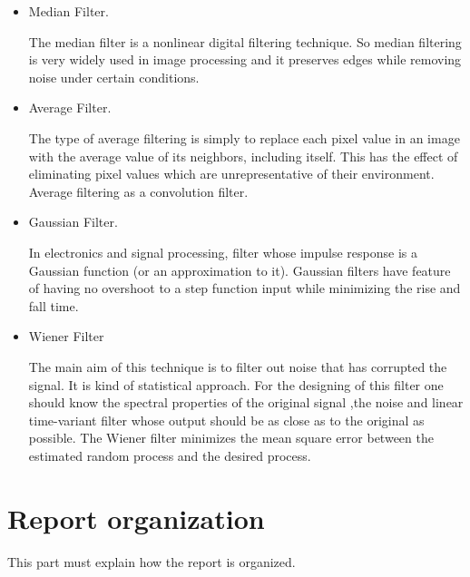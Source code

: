 \begin{itemize}
\item Median Filter.

The median filter is a nonlinear digital filtering technique. So median filtering is very widely used in
image processing and it preserves edges while removing noise under certain conditions.
\item Average Filter.

The type of average filtering is simply to replace each pixel value in an image with the average value of its neighbors, including itself. This has the effect of eliminating pixel values which are unrepresentative
of their environment. Average filtering as a convolution filter.
\item Gaussian Filter.

In electronics and signal processing, filter whose impulse response is a Gaussian function (or an approximation
to it). Gaussian filters have feature of having no overshoot to a step function input while
minimizing the rise and fall time.
 
\item Wiener Filter

The main aim of this technique is to filter out noise that has corrupted the signal. It is kind of statistical
approach. For the designing of this filter one should know the spectral properties of the original signal
,the noise and linear time-variant filter whose output should be as close as to the original as possible.
The Wiener filter minimizes the mean square error between the estimated random process and the
desired process.
\end{itemize}


\vspace*{1cm}











\section{Report organization}

This part must explain how the report is organized.
